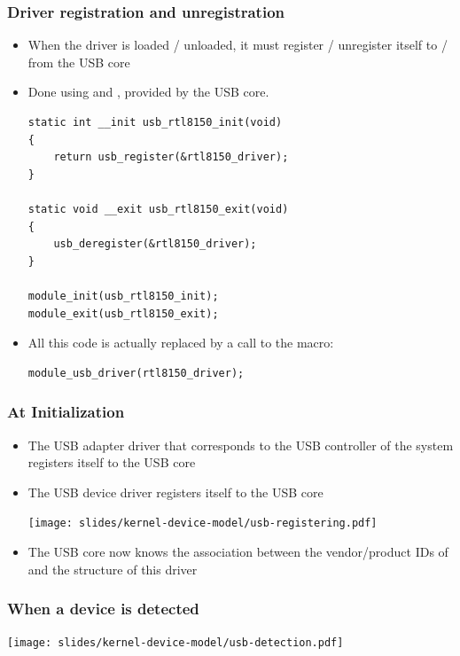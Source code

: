 \begin{frame}[fragile]
  \frametitle{Driver registration and unregistration}
  \begin{itemize}
  \small
  \item When the driver is loaded / unloaded, it must register /
    unregister itself to / from the USB core
  \item Done using  and ,
    provided by the USB core.
    \begin{block}{}
\begin{verbatim}
static int __init usb_rtl8150_init(void)
{
    return usb_register(&rtl8150_driver);
}

static void __exit usb_rtl8150_exit(void)
{
    usb_deregister(&rtl8150_driver);
}

module_init(usb_rtl8150_init);
module_exit(usb_rtl8150_exit);
\end{verbatim}
\end{block}
\item All this code is actually replaced by a call to the  macro:
    \begin{block}{}
\begin{verbatim}
module_usb_driver(rtl8150_driver);
\end{verbatim}
\end{block}
  \end{itemize}
\end{frame}

\begin{frame}
  \frametitle{At Initialization}
  \begin{itemize}
  \item The USB adapter driver that corresponds to the USB controller
    of the system registers itself to the USB core
  \item The  USB device driver registers itself to the USB core
    \begin{center}
      \texttt{[image: slides/kernel-device-model/usb-registering.pdf]}
    \end{center}
  \item The USB core now knows the association between the
    vendor/product IDs of  and the  structure
    of this driver
  \end{itemize}
\end{frame}

\begin{frame}
  \frametitle{When a device is detected}
  \begin{center}
    \texttt{[image: slides/kernel-device-model/usb-detection.pdf]}
  \end{center}
\end{frame}

